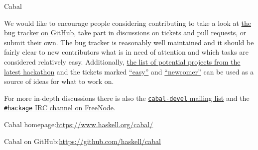 \begin{hcarentry}{Cabal}
\begin{compactitem}
\end{compactitem}

We would like to encourage people considering contributing to take a
look at \href{https://github.com/haskell/cabal/issues/}{the bug
  tracker on GitHub}, take part in discussions on tickets and pull
requests, or submit their own. The bug tracker is reasonably well
maintained and it should be fairly clear to new contributors what
is in need of attention and which tasks are considered relatively
easy. Additionally,
\href{https://github.com/haskell/cabal/wiki/ZuriHac-2018}{the list
  of potential projects from the latest hackathon} and the tickets
marked
\href{https://github.com/haskell/cabal/issues?q=is\%3Aopen+is\%3Aissue+label\%3A\%22meta\%3A+easy\%22}{“easy”}
and
\href{https://github.com/haskell/cabal/issues?q=is\%3Aopen+is\%3Aissue+label\%3Anewcomer}{“newcomer”}
can be used as a source of ideas for what to work on.

For more in-depth discussions there is also the
\href{https://mail.haskell.org/mailman/listinfo/cabal-devel}{\texttt{cabal-devel}
  mailing list} and the
\href{http://ircbrowse.net/browse/hackage}{\texttt{\#hackage} IRC
  channel on FreeNode}.

\FurtherReading
\begin{compactitem}
\item Cabal homepage:\hfill\url{https://www.haskell.org/cabal/}\\
\item Cabal on GitHub:\hfill\url{https://github.com/haskell/cabal}
\end{compactitem}
\end{hcarentry}

